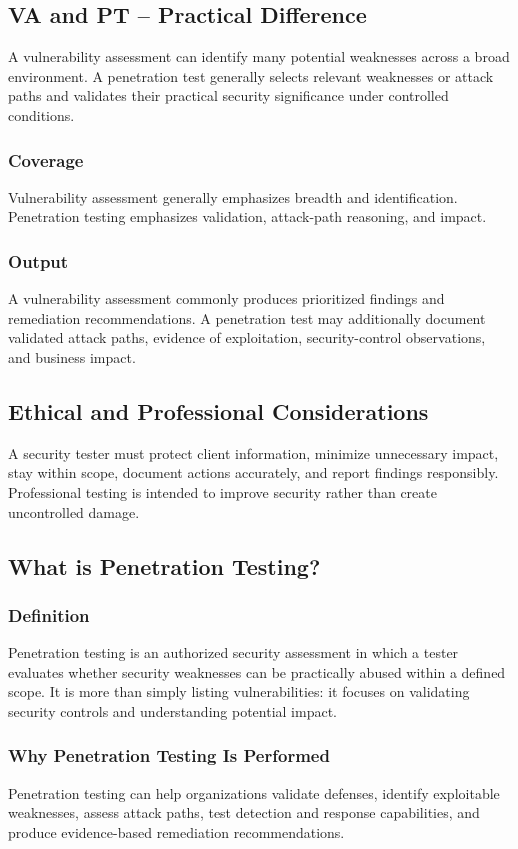 \documentclass[11pt,a4paper]{article}
\begin{document}
\subsection{VA and PT – Practical Difference}
A vulnerability assessment can identify many potential weaknesses across a broad environment. A penetration test generally selects relevant weaknesses or attack paths and validates their practical security significance under controlled conditions.

\subsubsection{Coverage}
Vulnerability assessment generally emphasizes breadth and identification. Penetration testing emphasizes validation, attack-path reasoning, and impact.

\subsubsection{Output}
A vulnerability assessment commonly produces prioritized findings and remediation recommendations. A penetration test may additionally document validated attack paths, evidence of exploitation, security-control observations, and business impact.

\subsection{Ethical and Professional Considerations}
A security tester must protect client information, minimize unnecessary impact, stay within scope, document actions accurately, and report findings responsibly. Professional testing is intended to improve security rather than create uncontrolled damage.

\subsection{What is Penetration Testing?}
\subsubsection{Definition}
Penetration testing is an authorized security assessment in which a tester evaluates whether security weaknesses can be practically abused within a defined scope. It is more than simply listing vulnerabilities: it focuses on validating security controls and understanding potential impact.

\subsubsection{Why Penetration Testing Is Performed}
Penetration testing can help organizations validate defenses, identify exploitable weaknesses, assess attack paths, test detection and response capabilities, and produce evidence-based remediation recommendations.
\end{document}

